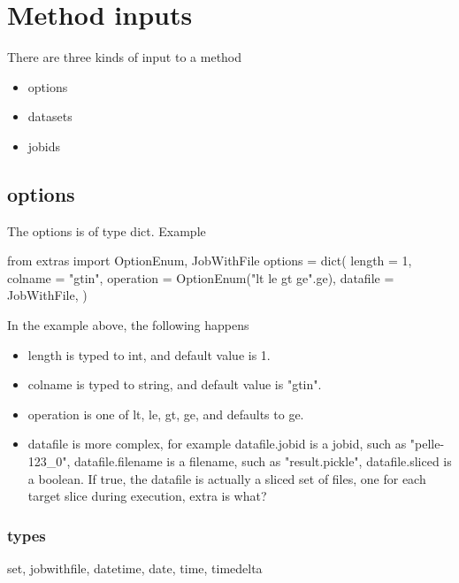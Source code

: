 \section{Method inputs}

There are three kinds of input to a method
\begin{itemize}
\item options
\item datasets
\item jobids
\end{itemize}


\subsection*{options}
The options is of type dict.  Example

\begin{python}
from extras import OptionEnum, JobWithFile
options = dict(
  length = 1,
  colname = "gtin",
  operation = OptionEnum("lt le gt ge".ge),
  datafile = JobWithFile,
)
\end{python}
In the example above, the following happens
\begin{itemize}
\item length is typed to int, and default value is 1.
\item colname is typed to string, and default value is "gtin".
\item operation is one of lt, le, gt, ge, and defaults to ge.
\item datafile is more complex, for example datafile.jobid is a jobid,
  such as "pelle-123\_0", datafile.filename is a filename, such as
  "result.pickle", datafile.sliced is a boolean.  If true, the
  datafile is actually a sliced set of files, one for each target
  slice during execution, extra is what?
\end{itemize}

\subsubsection{types}
set, jobwithfile, datetime, date, time, timedelta




